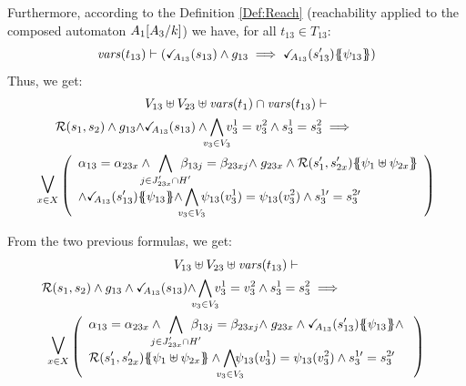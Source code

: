\documentclass[runningheads]{llncs}
\begin{document}
\begin{enumerate}
 Furthermore,  according to the Definition \ref{Def:Reach} (reachability applied to the composed automaton ${A_1{\left[A_3\middle/k\right]}}$) we have, for all $t_{13} \in T_{13}$:
\[ \fvars{t_{13}} \vdash \left(\reach{A_{13}}\mpar{s_{13}} \wedge g_{13} \implies \reach{A_{13}}\mpar{s_{13}'}\psubst{\psi_{13}}\right) \]	
Thus, we get:
\begin{multline*}
V_{13} \uplus V_{23} \uplus \fvars{t_1}  \cap \fvars{t_{13}} \vdash\\
\mathcal{R}\mpar{s_1, s_{2}} \wedge g_{13}  {\wedge \reach{A_{13}}\mpar{s_{13}}}
\wedge \bigwedge_\subbox{v_3\in V_3}  v^1_3=v^2_3\wedge s^1_3=s^2_3
\implies \hspace{5em} \\ \operatorname*{\bigsymb{\bigvee}}_{x \in X} \mpar{\everymath{\displaystyle}
\begin{array}{l}
			\alpha_{13} = \alpha_{23x} \wedge \bigwedge_\subbox{j \in J'_{23x} \cap H'} \beta_{13j} = \beta_{23xj} \nwedge 	g_{23x} \wedge \mathcal{R}\mpar{s'_1, s'_{2x}}\psubst{\psi_1 \uplus \psi_{2x}}\\
		  \wedge {\reach{A_{13}}\mpar{s_{13}'}\psubst{\psi_{13}} 
\wedge} \bigwedge_\subbox{v_3\in V_3}  \psi_{13}(v^1_3)=\psi_{13}(v^2_3)\wedge s^{1\prime}_3=s^{2\prime}_3
		\end{array}}   
\end{multline*}
	
From the two previous formulas, we get:
\begin{multline*}
V_{13} \uplus V_{23} \uplus \fvars{t_{13}}  \vdash\\
\mathcal{R}\mpar{s_1, s_{2}} \wedge g_{13} \land {\reach{A_{13}}\mpar{s_{13}} \land} \bigwedge_\subbox{v_3\in V_3} v^1_3=v^2_3 \wedge s^1_3 = s^2_3
\implies \hspace{7em} \\ \operatorname*{\bigsymb{\bigvee}}_{x \in X} \mpar{\everymath{\displaystyle}
\begin{array}{l}
			\alpha_{13} = \alpha_{23x} \wedge \bigwedge_\subbox{j \in J'_{23x} \cap H'} \beta_{13j} = \beta_{23xj} \nwedge g_{23x}\land  {\reach{A_{13}}\mpar{s_{13}'}\psubst{\psi_{13}}}		\nwedge\\
			  \mathcal{R}\mpar{s'_1, s'_{2x}}\psubst{\psi_1 \uplus \psi_{2x}} \wedge
 \bigwedge_\subbox{v_3\in V_3}\!\! \psi_{13}(v^1_3)=\psi_{13}(v^2_3) \wedge s^{1\prime}_3 = s^{2\prime}_3
		\end{array}}   
\end{multline*}


\end{enumerate}
\end{document}
